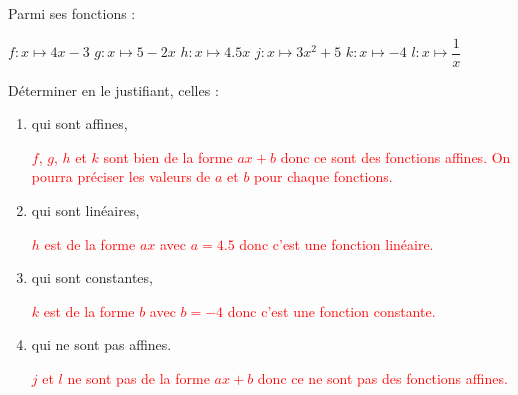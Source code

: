 \begin{corrige}
    Parmi ses fonctions :
    \begin{multicols}{2}
    \begin{itemize}
        \def\item{}
        \item $f:x\longmapsto 4x-3$
        \item $g:x\longmapsto 5-2x$
        \columnbreak
        \item $h:x\longmapsto \num{4.5}{x}$
        \item $j:x\longmapsto 3x^2+5$        
        \item $k:x\longmapsto -4$
        \item $l:x\longmapsto \dfrac{1}{x}$
    \end{itemize}
    \end{multicols}
    Déterminer en le justifiant, celles :

    \begin{enumerate}
        \item qui sont affines,
        
        \textcolor{red}{$f$, $g$, $h$ et $k$ sont bien de la forme $ax+b$ donc ce sont des fonctions affines. On pourra préciser les valeurs de $a$ et $b$ pour chaque fonctions.}
        \item qui sont linéaires,
        
        \textcolor{red}{$h$ est de la forme $ax$ avec $a=\num{4.5}$ donc c'est une fonction linéaire.}
        \item qui sont constantes,
        
        \textcolor{red}{$k$ est de la forme $b$ avec $b=-4$ donc c'est une fonction constante.}
        \item qui ne sont pas affines.
        
        \textcolor{red}{$j$ et $l$ ne sont pas de la forme $ax+b$ donc ce ne sont pas des fonctions affines.}
    \end{enumerate}
\end{corrige}
